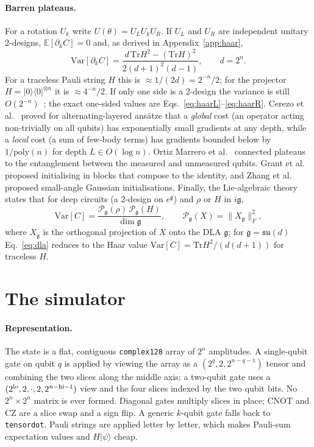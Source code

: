 \documentclass[11pt]{article}
\newcommand{\Var}{\mathrm{Var}}
\newcommand{\Tr}{\mathrm{Tr}}
\newcommand{\g}{\mathfrak{g}}
\newcommand{\E}{\mathbb{E}}
\begin{document}
\paragraph{Barren plateaus.}
For a rotation $U_k$ write $U(\theta)=U_L U_k U_R$. If $U_L$ and $U_R$ are independent unitary 2-designs, $\E[\partial_k C]=0$ and, as derived in Appendix~\ref{app:haar},
\begin{equation}
  \Var[\partial_k C] = \frac{d\,\Tr H^2-(\Tr H)^2}{2(d+1)^2(d-1)},\qquad d=2^n .
  \label{eq:haar2}
\end{equation}
For a traceless Pauli string $H$ this is $\approx 1/(2d)=2^{-n}/2$; for the projector $H=|0\rangle\langle0|^{\otimes n}$ it is $\approx 4^{-n}/2$. If only one side is a 2-design the variance is still $O(2^{-n})$~\cite{mcclean2018}; the exact one-sided values are Eqs.~\eqref{eq:haarL}--\eqref{eq:haarR}. Cerezo et al.~\cite{cerezo2021} proved for alternating-layered ans\"atze that a \emph{global} cost (an operator acting non-trivially on all qubits) has exponentially small gradients at any depth, while a \emph{local} cost (a sum of few-body terms) has gradients bounded below by $1/\mathrm{poly}(n)$ for depth $L\in O(\log n)$. Ortiz Marrero et al.~\cite{ortiz2021} connected plateaus to the entanglement between the measured and unmeasured qubits. Grant et al.~\cite{grant2019} proposed initialising in blocks that compose to the identity, and Zhang et al.~\cite{zhang2022} proposed small-angle Gaussian initialisations. Finally, the Lie-algebraic theory~\cite{larocca2022,ragone2024,fontana2024} states that for deep circuits (a 2-design on $e^{\g}$) and $\rho$ or $H$ in $i\g$,
\begin{equation}
  \Var[C]=\frac{\mathcal P_\g(\rho)\,\mathcal P_\g(H)}{\dim\g},\qquad \mathcal P_\g(X)=\|X_\g\|_F^2,
  \label{eq:dla}
\end{equation}
where $X_\g$ is the orthogonal projection of $X$ onto the DLA $\g$; for $\g=\mathfrak{su}(d)$ Eq.~\eqref{eq:dla} reduces to the Haar value $\Var[C]=\Tr H^2/(d(d+1))$ for traceless $H$.

\section{The simulator}
\label{sec:sim}

\paragraph{Representation.}
The state is a flat, contiguous \texttt{complex128} array of $2^n$ amplitudes. A single-qubit gate on qubit $q$ is applied by viewing the array as a $(2^q,2,2^{n-q-1})$ tensor and combining the two slices along the middle axis; a two-qubit gate uses a $(2^{\rm lo},2,\cdot,2,2^{n-{\rm hi}-1})$ view and the four slices indexed by the two qubit bits. No $2^n\times 2^n$ matrix is ever formed. Diagonal gates multiply slices in place; CNOT and CZ are a slice swap and a sign flip. A generic $k$-qubit gate falls back to \texttt{tensordot}. Pauli strings are applied letter by letter, which makes Pauli-sum expectation values and $H|\psi\rangle$ cheap.
\end{document}

